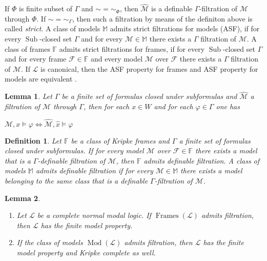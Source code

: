 \documentclass[a4paper]{article}
\theoremstyle{defin}
\newtheorem{defin}{Definition}
\theoremstyle{theorem}
\theoremstyle{prop}
\theoremstyle{lemma}
\newtheorem{lemma}{Lemma}
\theoremstyle{fact}
\theoremstyle{ex}
\theoremstyle{col}
\begin{document}
If $\Phi$ is finite subset of $\Gamma$ and $\sim = \sim_{\Phi}$, then $\widehat{\mathcal{M}}$ is a definable $\Gamma$-filtration of $\mathcal{M}$ through $\Phi$. If $\sim = \sim_{\Gamma}$, then such a filtration by means of the definiton above is called \emph{strict}. A class of models $\mathbb{M}$ admits strict filtrations for models (ASF), if for every $\operatorname{Sub}$-closed set $\Gamma$ and for every $\mathcal{M} \in \mathbb{M}$ there exists a $\Gamma$ filtration of $\mathcal{M}$.
A class of frames $\mathbb{F}$ admits strict filtrations for frames, if for every $\operatorname{Sub}$-closed set $\Gamma$ and for every frame $\mathcal{F} \in \mathbb{F}$ and every model $\mathcal{M}$ over $\mathcal{F}$ there exists a $\Gamma$ filtration of $\mathcal{M}$. If $\mathcal{L}$ is canonical, then the ASF property for frames and ASF property for models are equivalent \cite[Theorem 2.10]{kikot2020completeness}.

\begin{lemma}
  Let $\Gamma$ be a finite set of formulas closed under subformulas and $\widehat{\mathcal{M}}$ a filtration of $\mathcal{M}$ through $\Gamma$, then for each $x \in W$ and for each $\varphi \in \Gamma$ one has
  \begin{center}
    $\mathcal{M}, x \models \varphi \Leftrightarrow \widehat{\mathcal{M}}, \hat{x} \models \varphi$
  \end{center}
\end{lemma}

\begin{defin} Let $\mathbb{F}$ be a class of Kripke frames and $\Gamma$ a finite set of formulas closed under subformulas. If for every model $\mathcal{M}$ over $\mathcal{F} \in \mathbb{F}$ there exists a model that is a $\Gamma$-definable filtration of $\mathcal{M}$, then $\mathbb{F}$ admits definable filtration. A class of models $\mathbb{M}$ admits definable filtration if for every $\mathcal{M} \in \mathbb{M}$ there exists a model belonging to the same class that is a definable $\Gamma$-filtration of $\mathcal{M}$.
\end{defin}

\begin{lemma}
  $ $

\begin{enumerate}
  \item Let $\mathcal{L}$ be a complete normal modal logic. If $\operatorname{Frames}(\mathcal{L})$ admits filtration, then $\mathcal{L}$ has the finite model property.
  \item If the class of models $\operatorname{Mod}(\mathcal{L})$ admits filtration, then $\mathcal{L}$ has the finite model property and Kripke complete as well.
\end{enumerate}
\end{lemma}
\end{document}
